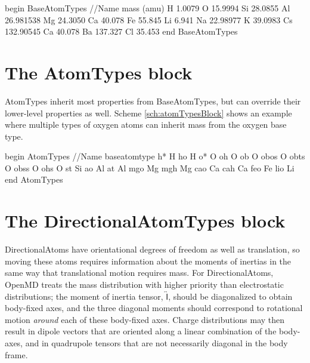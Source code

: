 \documentclass[]{book}
\begin{document}
\begin{code}[caption={[A simple example of a BaseAtomTypes
block.] A simple example of a BaseAtomTypes block.},
label={sch:baseAtomTypesBlock}] 
begin BaseAtomTypes
//Name  mass (amu)
H       1.0079
O       15.9994
Si      28.0855
Al      26.981538
Mg      24.3050
Ca      40.078
Fe      55.845
Li      6.941
Na      22.98977
K       39.0983
Cs      132.90545
Ca      40.078
Ba      137.327
Cl      35.453
end BaseAtomTypes
\end{code}

\section{\label{section:ffAtom}The AtomTypes block}

AtomTypes inherit most properties from BaseAtomTypes, but can override
their lower-level properties as well.  Scheme \ref{sch:atomTypesBlock}
shows an example where multiple types of oxygen atoms can inherit mass
from the oxygen base type.

\begin{code}[caption={[An example of a AtomTypes block.] A
simple example of an AtomTypes block which
shows how multiple types can inherit from the same base type.},
label={sch:atomTypesBlock}]
begin AtomTypes    
//Name  baseatomtype
h*      H
ho      H
o*      O
oh      O
ob      O
obos    O
obts    O
obss    O
ohs     O
st      Si
ao      Al
at      Al
mgo     Mg
mgh     Mg
cao     Ca
cah     Ca
feo     Fe
lio     Li
end AtomTypes
\end{code}

\section{\label{section:ffDirectionalAtom}The DirectionalAtomTypes
  block}
DirectionalAtoms have orientational degrees of freedom as well as
translation, so moving these atoms requires information about the
moments of inertias in the same way that translational motion requires
mass.  For DirectionalAtoms, OpenMD treats the mass distribution with
higher priority than electrostatic distributions; the moment of
inertia tensor, $\overleftrightarrow{\mathsf I}$, should be
diagonalized to obtain body-fixed axes, and the three diagonal moments
should correspond to rotational motion \textit{around} each of these
body-fixed axes.  Charge distributions may then result in dipole
vectors that are oriented along a linear combination of the body-axes,
and in quadrupole tensors that are not necessarily diagonal in the
body frame. 
\end{document}
